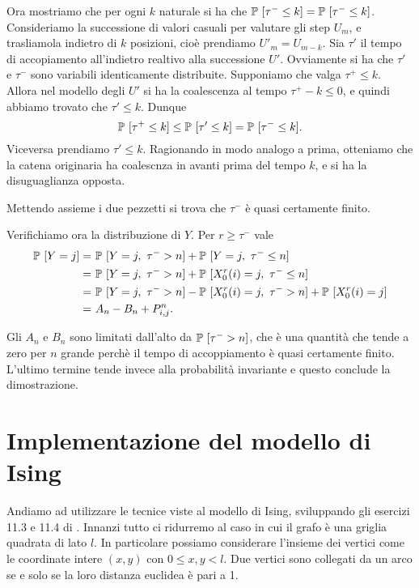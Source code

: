 \documentclass[]{marticle}
\begin{document}
Ora mostriamo che per ogni $k$ naturale si ha che $\mathbb{P}\ [\tau^- \leq k] =
\mathbb{P}\ [\tau^- \leq k]$. Consideriamo la successione di valori casuali per
valutare gli step $U_m$, e trasliamola indietro di $k$ posizioni, cio\`e
prendiamo $U'_m = U_{m-k}$. Sia $\tau'$ il tempo di accopiamento all'indietro
realtivo alla successione $U'$. Ovviamente si ha che $\tau'$ e $\tau^-$ sono
variabili identicamente distribuite. Supponiamo che valga $\tau^+ \leq k$.
Allora nel modello degli $U'$ si ha la coalescenza al tempo $\tau^+ - k  \leq
0$, e quindi abbiamo trovato che $\tau' \leq k$. Dunque
\[
    \mathbb{P}\ [ \tau^+ \leq k] \leq \mathbb{P}\ [ \tau' \leq k] = \mathbb{P}\ [ \tau^- \leq k].
\]
Viceversa prendiamo $\tau' \leq k$. Ragionando in modo analogo a prima,
otteniamo che la catena originaria ha coalescnza in avanti prima del tempo $k$,
e si ha la disuguaglianza opposta.

Mettendo assieme i due pezzetti si trova che $\tau^-$ \`e quasi certamente
finito. 

Verifichiamo ora la distribuzione di $Y$. Per $r \geq \tau^-$ vale
\begin{align*}
    \mathbb{P}\ [Y=j] =&\ \mathbb{P}\ [Y=j,\ \tau^- > n] + \mathbb{P}\ [Y=j,\ \tau^- \leq n] \\
    =&\ \mathbb{P}\ [Y=j,\ \tau^- > n] + \mathbb{P}\ [X_0^r(i)=j,\ \tau^- \leq n] \\
    =&\ \mathbb{P}\ [Y=j,\ \tau^- > n] - \mathbb{P}\ [X_0^r(i)=j,\ \tau^- > n] 
            + \mathbb{P}\ [X_0^r(i)=j] \\
    =&\ A_n - B_n + P^n_{i,j}.
\end{align*}

Gli $A_n$ e $B_n$ sono limitati dall'alto da $\mathbb{P}\ [\tau^- > n]$, che \`e una
quantit\`a che tende a zero per $n$ grande perch\`e il tempo di accoppiamento
\`e quasi certamente finito. L'ultimo termine tende invece alla probabilit\`a
invariante e questo conclude la dimostrazione.


\section{Implementazione del modello di Ising}
Andiamo ad utilizzare le tecnice viste al modello di Ising, sviluppando gli
esercizi 11.3 e 11.4 di \cite{haggstrom}. Innanzi tutto ci ridurremo al caso in
cui il grafo \`e una griglia quadrata di lato $l$. In particolare possiamo
considerare l'insieme dei vertici come le coordinate intere $(x,y)$ con $0\leq
x,y < l$. Due vertici sono collegati da un arco se e solo se la loro distanza
euclidea \`e pari a 1.
\end{document}
